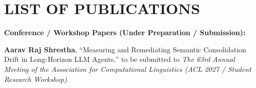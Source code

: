 \documentclass[12pt,a4paper]{report}
\begin{document}
\clearpage

\chapter*{LIST OF PUBLICATIONS}

\noindent
\textbf{Conference / Workshop Papers (Under Preparation / Submission):}
\begin{enumerate}[label={[\arabic*]}]
    \item \textbf{Aarav Raj Shrestha}, ``Measuring and Remediating Semantic Consolidation Drift in Long-Horizon LLM Agents,'' to be submitted to \textit{The 63rd Annual Meeting of the Association for Computational Linguistics (ACL 2027 / Student Research Workshop)}.
\end{enumerate}
\end{document}
